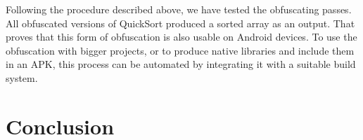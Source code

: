 \documentclass[
  digital, %
  notable,   %
  twoside, %
  nolof,     %
  nolot,     %
]{fithesis3}
\theoremstyle{definition}
\begin{document}
Following the procedure described above, we have tested the obfuscating passes. All obfuscated versions of QuickSort produced a sorted array as an output. That proves that this form of obfuscation is also usable on Android devices. To use the obfuscation with bigger projects, or to produce native libraries and include them in an APK, this process can be automated by integrating it with a suitable build system. 

\chapter{Conclusion}


\printbibliography[heading=bibintoc] %
\end{document}
